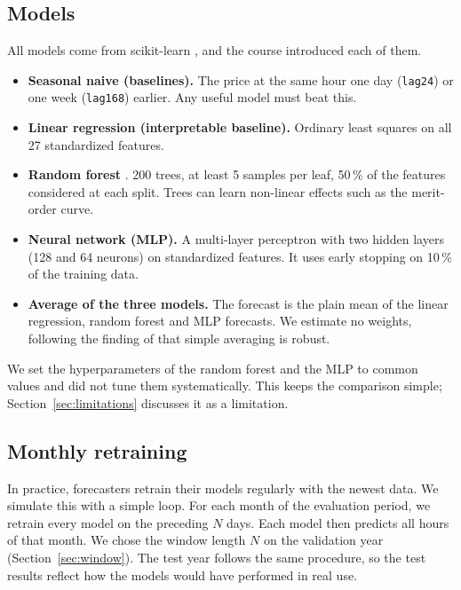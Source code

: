 \documentclass[12pt,oneside]{article}
\begin{document}
\subsection{Models}

All models come from scikit-learn \citep{pedregosa2011}, and the course introduced each of them.

\begin{itemize}
    \item \textbf{Seasonal naive (baselines).} The price at the same hour one day (\texttt{lag24}) or one week (\texttt{lag168}) earlier. Any useful model must beat this.
    \item \textbf{Linear regression (interpretable baseline).} Ordinary least squares on all 27 standardized features.
    \item \textbf{Random forest} \citep{breiman2001}. 200 trees, at least 5 samples per leaf, 50\,\% of the features considered at each split. Trees can learn non-linear effects such as the merit-order curve.
    \item \textbf{Neural network (MLP).} A multi-layer perceptron with two hidden layers (128 and 64 neurons) on standardized features. It uses early stopping on 10\,\% of the training data.
    \item \textbf{Average of the three models.} The forecast is the plain mean of the linear regression, random forest and MLP forecasts. We estimate no weights, following the finding of \citet{nowotarski2014} that simple averaging is robust.
\end{itemize}

We set the hyperparameters of the random forest and the MLP to common values and did not tune them systematically. This keeps the comparison simple; Section~\ref{sec:limitations} discusses it as a limitation.

\subsection{Monthly retraining} \label{sec:rolling}

In practice, forecasters retrain their models regularly with the newest data. We simulate this with a simple loop. For each month of the evaluation period, we retrain every model on the preceding $N$ days. Each model then predicts all hours of that month. We chose the window length $N$ on the validation year (Section~\ref{sec:window}). The test year follows the same procedure, so the test results reflect how the models would have performed in real use.
\end{document}

